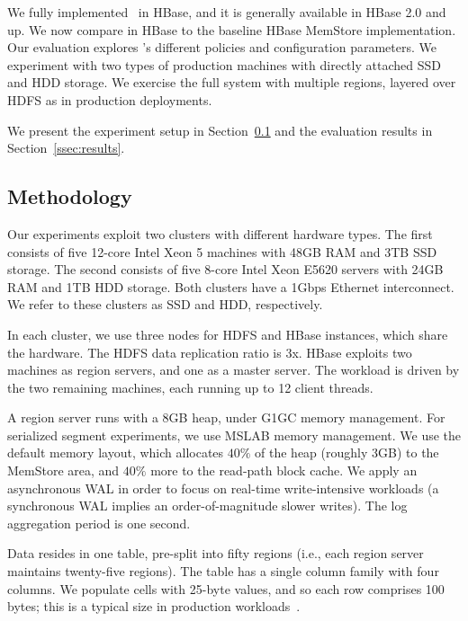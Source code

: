 We fully implemented \sys\ in HBase, and it is generally available 
in HBase 2.0 and up. 
We now compare \sys\/ in HBase to the baseline HBase MemStore implementation.  
Our evaluation explores \sys's different policies and configuration parameters.  
We experiment with two types of production machines with directly attached SSD 
and HDD storage. We exercise the full system with multiple regions, layered over HDFS
as in production deployments.

We present the experiment setup in Section~\ref{ssec:setup} and the evaluation 
results in Section~\ref{ssec:results}. 

\subsection{Methodology}
\label{ssec:setup}

Our experiments exploit two clusters with different hardware types. The first  consists of five 12-core Intel Xeon 5 
machines with 48GB RAM and 3TB SSD storage. The second  consists of five 8-core Intel Xeon E5620 servers 
with 24GB RAM and 1TB HDD storage. Both clusters have a 1Gbps Ethernet interconnect. We refer to these clusters as
SSD and HDD, respectively.

In each cluster, we use three nodes for HDFS and HBase instances, which share the hardware. The HDFS data 
replication ratio is 3x. HBase exploits two machines as region servers, and one as a master server. 
The workload is driven by the two remaining machines, each running up to 12 client threads. 

A region server runs  with a 8GB heap, under G1GC memory management. For serialized segment experiments, we use MSLAB memory management.
We use the default memory layout,  which allocates $40\%$ of the heap (roughly 3GB) to the MemStore 
area, and $40\%$ more to the read-path block cache. We apply an asynchronous WAL in order to focus on real-time 
write-intensive workloads (a synchronous WAL implies an order-of-magnitude slower writes). The log aggregation
period is one second. 


Data resides in one table, pre-split into fifty regions (i.e., each region server maintains twenty-five regions). 
The table has a single column family with four columns. 
We populate cells with 25-byte values, and so each row comprises 100 bytes; 
this is a typical size in production workloads~\cite{Wu2015}.

